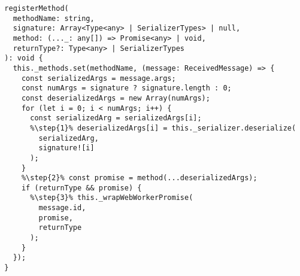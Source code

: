\begin{verbatim}
  registerMethod(
    methodName: string,
    signature: Array<Type<any> | SerializerTypes> | null,
    method: (..._: any[]) => Promise<any> | void,
    returnType?: Type<any> | SerializerTypes
  ): void {
    this._methods.set(methodName, (message: ReceivedMessage) => {
      const serializedArgs = message.args;
      const numArgs = signature ? signature.length : 0;
      const deserializedArgs = new Array(numArgs);
      for (let i = 0; i < numArgs; i++) {
        const serializedArg = serializedArgs[i];
        %\step{1}% deserializedArgs[i] = this._serializer.deserialize(
          serializedArg,
          signature![i]
        );
      }
      %\step{2}% const promise = method(...deserializedArgs);
      if (returnType && promise) {
        %\step{3}% this._wrapWebWorkerPromise(
          message.id,
          promise,
          returnType
        );
      }
    });
  }
\end{verbatim}
